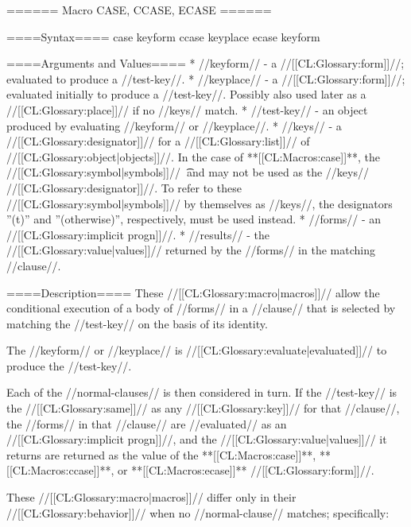 ====== Macro CASE, CCASE, ECASE ======

====Syntax====
\DefmacWithValues case {keyform  } {} 
\DefmacWithValues ccase {keyplace } {} 
\DefmacWithValues ecase {keyform } {}


====Arguments and Values====
  * //keyform// - a //[[CL:Glossary:form]]//; evaluated to produce a //test-key//.
  * //keyplace// - a //[[CL:Glossary:form]]//; evaluated initially to produce a //test-key//. Possibly also used later as a //[[CL:Glossary:place]]// if no //keys// match.
  * //test-key// - an object produced by evaluating //keyform// or //keyplace//.
  * //keys// - a //[[CL:Glossary:designator]]// for a //[[CL:Glossary:list]]// of //[[CL:Glossary:object|objects]]//. In the case of **[[CL:Macros:case]]**, the //[[CL:Glossary:symbol|symbols]]// \t\ and  may not be used as the //keys// //[[CL:Glossary:designator]]//. To refer to these //[[CL:Glossary:symbol|symbols]]// by themselves as //keys//, the designators ''(t)'' and ''(otherwise)'', respectively, must be used instead.
  * //forms// - an //[[CL:Glossary:implicit progn]]//.
  * //results// - the //[[CL:Glossary:value|values]]// returned by the //forms// in the matching //clause//.

====Description====
These //[[CL:Glossary:macro|macros]]// allow the conditional execution of a body of //forms// in a //clause// that is selected by matching the //test-key// on the basis of its identity.

The //keyform// or //keyplace// is //[[CL:Glossary:evaluate|evaluated]]// to produce the //test-key//.

Each of the //normal-clauses// is then considered in turn. If the //test-key// is the //[[CL:Glossary:same]]// as any //[[CL:Glossary:key]]// for that //clause//, the //forms// in that //clause// are //evaluated// as an //[[CL:Glossary:implicit progn]]//, and the //[[CL:Glossary:value|values]]// it returns are returned as the value of the **[[CL:Macros:case]]**, **[[CL:Macros:ccase]]**, or **[[CL:Macros:ecase]]** //[[CL:Glossary:form]]//.

These //[[CL:Glossary:macro|macros]]// differ only in their //[[CL:Glossary:behavior]]// when no //normal-clause// matches; specifically:


